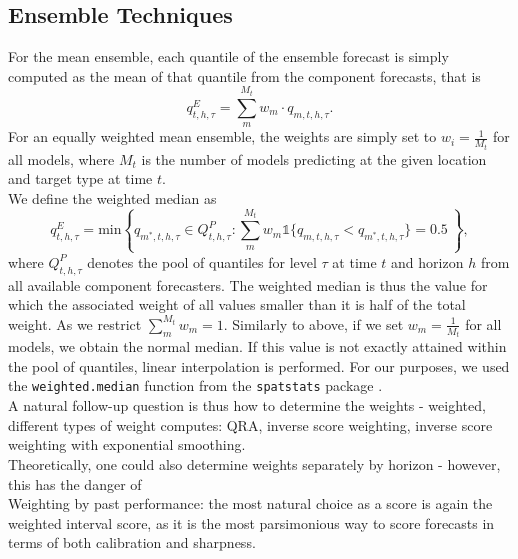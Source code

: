 \subsection{Ensemble Techniques} \label{sub:ensemble_techniques}
For the mean ensemble, each quantile of the ensemble forecast is simply computed as the mean of that quantile from the component forecasts, that is
\begin{equation}
q^E_{t,h,\tau} = \sum_m^{M_t} w_m \cdot q_{m, t, h, \tau}.
\end{equation}
For an equally weighted mean ensemble, the weights are simply set to $w_i = \frac{1}{M_t}$ for all models, where $M_t$ is the number of models predicting at the given location and target type at time $t$.  \\
We define the weighted median as 
\begin{equation}
q^E_{t,h,\tau} = \text{min}\left\{q_{m^{*},t,h,\tau} \in Q^P_{t,h,\tau}: \sum_m^{M_t}  w_m \mathbb{1}\{q_{m,t,h,\tau} < q_{m^{*},t,h,\tau} \} = 0.5 \ \right\},
\end{equation}
where $Q^P_{t,h,\tau}$ denotes the pool of quantiles for level $\tau$ at time $t$ and horizon $h$ from all available component forecasters. The weighted median is thus the value for which the associated weight of all values smaller than it is half of the total weight. As we restrict $\sum_m^{M_t}w_m = 1$. Similarly to above, if we set $w_m = \frac{1}{M_t}$ for all models, we obtain the normal median. If this value is not exactly attained within the pool of quantiles, linear interpolation is performed. For our purposes, we used the \texttt{weighted.median} function from the \texttt{spatstats} package \citep{baddeley_spatstat_2005}.\\
A natural follow-up question is thus how to determine the weights 
- weighted, different types of weight computes: QRA, inverse score weighting, inverse score weighting with exponential smoothing. \\
Theoretically, one could also determine weights separately by horizon - however, this has the danger of \\
Weighting by past performance: the most natural choice as a score is again the weighted interval score, as it is the most parsimonious way to score forecasts in terms of both calibration and sharpness. 
